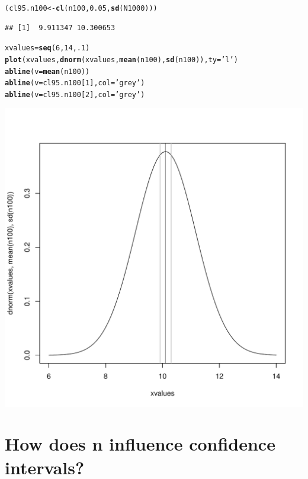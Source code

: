 \documentclass{tufte-handout}\usepackage[]{graphicx}\usepackage[]{color}
\makeatletter
\def\maxwidth{ %
  \ifdim\Gin@nat@width>\linewidth
    \linewidth
  \else
    \Gin@nat@width
  \fi
}
\newcommand{\hlnum}[1]{\textcolor[rgb]{0.686,0.059,0.569}{#1}}%
\newcommand{\hlstr}[1]{\textcolor[rgb]{0.192,0.494,0.8}{#1}}%
\newcommand{\hlstd}[1]{\textcolor[rgb]{0.345,0.345,0.345}{#1}}%
\newcommand{\hlkwb}[1]{\textcolor[rgb]{0.69,0.353,0.396}{#1}}%
\newcommand{\hlkwc}[1]{\textcolor[rgb]{0.333,0.667,0.333}{#1}}%
\newcommand{\hlkwd}[1]{\textcolor[rgb]{0.737,0.353,0.396}{\textbf{#1}}}%
\newenvironment{kframe}{%
 \def\at@end@of@kframe{}%
 \ifinner\ifhmode%
  \def\at@end@of@kframe{\end{minipage}}%
  \begin{minipage}{\columnwidth}%
 \fi\fi%
 \def\FrameCommand##1{\hskip\@totalleftmargin \hskip-\fboxsep
 \colorbox{shadecolor}{##1}\hskip-\fboxsep
     \hskip-\linewidth \hskip-\@totalleftmargin \hskip\columnwidth}%
 \MakeFramed {\advance\hsize-\width
   \@totalleftmargin\z@ \linewidth\hsize
   \@setminipage}}%
 {\par\unskip\endMakeFramed%
 \at@end@of@kframe}
\newenvironment{knitrout}{}{} %
\makeatother
\begin{document}
\begin{knitrout}
\begin{kframe}
\begin{alltt}
\hlstd{(cl95.n100} \hlkwb{<-} \hlkwd{cl}\hlstd{(n100,} \hlnum{0.05}\hlstd{,} \hlkwd{sd}\hlstd{(N1000)))}
\end{alltt}
\begin{verbatim}
## [1]  9.911347 10.300653
\end{verbatim}
\begin{alltt}
\hlstd{xvalues} \hlkwb{=} \hlkwd{seq}\hlstd{(}\hlnum{6}\hlstd{,}\hlnum{14}\hlstd{,}\hlnum{.1}\hlstd{)}
\hlkwd{plot}\hlstd{(xvalues,} \hlkwd{dnorm}\hlstd{(xvalues,} \hlkwd{mean}\hlstd{(n100),} \hlkwd{sd}\hlstd{(n100)),} \hlkwc{ty}\hlstd{=}\hlstr{'l'}\hlstd{)}
\hlkwd{abline}\hlstd{(}\hlkwc{v}\hlstd{=}\hlkwd{mean}\hlstd{(n100))}
\hlkwd{abline}\hlstd{(}\hlkwc{v}\hlstd{=cl95.n100[}\hlnum{1}\hlstd{],} \hlkwc{col}\hlstd{=}\hlstr{'grey'}\hlstd{)}
\hlkwd{abline}\hlstd{(}\hlkwc{v}\hlstd{=cl95.n100[}\hlnum{2}\hlstd{],} \hlkwc{col}\hlstd{=}\hlstr{'grey'}\hlstd{)}
\end{alltt}
\end{kframe}
\includegraphics[width=\maxwidth]{figure/unnamed-chunk-28-1} 

\end{knitrout}

\section{How does n influence confidence intervals?}
\end{document}
